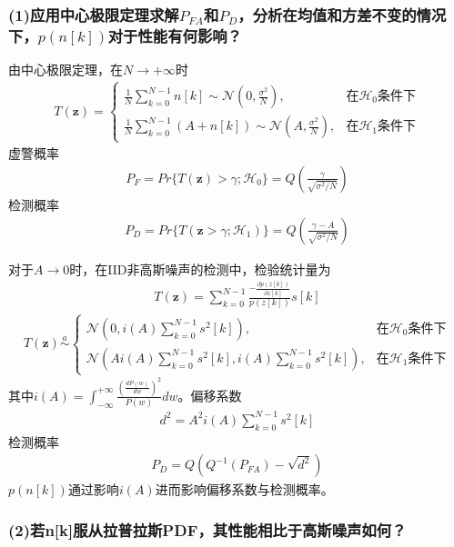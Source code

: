 \documentclass[fontset=windows]{article}
\numberwithin{figure}{section}
\begin{document}
\subsubsection*{(1)应用中心极限定理求解\(P_{FA}\)和\(P_D\)，分析在均值和方差不变的情况下，\(p(n[k])\)对于性能有何影响？}

由中心极限定理，在\(N\to +\infty\)时
\begin{align*}
	T(\mathbf{z})=\left\{
	\begin{matrix}
		\frac{1}{N}\sum_{k=0}^{N-1}n[k]\sim\mathcal{N}(0,\frac{\sigma^2}{N}),     & \text{在}\mathcal{H}_0\text{条件下} \\
		\frac{1}{N}\sum_{k=0}^{N-1}(A+n[k])\sim\mathcal{N}(A,\frac{\sigma^2}{N}), & \text{在}\mathcal{H}_1\text{条件下}
	\end{matrix}
	\right.
\end{align*}
虚警概率
\begin{align*}
	P_F=Pr\{T(\mathbf{z})>\gamma;\mathcal{H}_0\}=Q(\frac{\gamma}{\sqrt{\sigma^2/N}})
\end{align*}
检测概率
\begin{align*}
	P_D=Pr\{T(\mathbf{z}>\gamma;\mathcal{H}_1)\}=Q(\frac{\gamma-A}{\sqrt{\sigma^2/N}})
\end{align*}

对于\(A\to 0\)时，在IID非高斯噪声的检测中，检验统计量为
\begin{align*}
	T(\mathbf{z})=\sum_{k=0}^{N-1}\frac{-\frac{\partial p(z[k])}{\partial z[k]}}{p(z[k])}s[k]
\end{align*}
\begin{align*}
	T(\mathbf{z})\overset{a}{\sim}
	\left\{
	\begin{matrix}
		\mathcal{N}(0,i(A)\sum_{k=0}^{N-1}s^2[k]),                           & \text{在}\mathcal{H}_0\text{条件下} \\
		\mathcal{N}(Ai(A)\sum_{k=0}^{N-1}s^2[k],i(A)\sum_{k=0}^{N-1}s^2[k]), & \text{在}\mathcal{H}_1\text{条件下}
	\end{matrix}
	\right.
\end{align*}
其中\(i(A)=\int_{-\infty}^{+\infty}\frac{(\frac{dP(w)}{dw})^2}{P(w)}dw\)。偏移系数
\begin{align}
	d^2=A^2i(A)\sum_{k=0}^{N-1}s^2[k]
\end{align}
检测概率
\begin{align}
	P_D=Q(Q^{-1}(P_{FA})-\sqrt{d^2})
\end{align}
\(p(n[k])\)通过影响\(i(A)\)进而影响偏移系数与检测概率。

\subsubsection*{(2)若n[k]服从拉普拉斯PDF，其性能相比于高斯噪声如何？}
\end{document}
